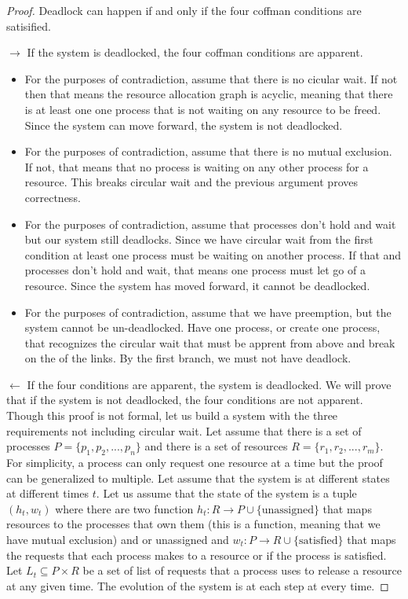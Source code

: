 \begin{proof} Deadlock can happen if and only if the four coffman conditions are satisified.

$\rightarrow$ If the system is deadlocked, the four coffman conditions are apparent.

\begin{itemize}
\item For the purposes of contradiction, assume that there is no cicular wait. If not then that means the resource allocation graph is acyclic, meaning that there is at least one one process that is not waiting on any resource to be freed. Since the system can move forward, the system is not deadlocked.
\item For the purposes of contradiction, assume that there is no mutual exclusion. If not, that means that no process is waiting on any other process for a resource. This breaks circular wait and the previous argument proves correctness.
\item For the purposes of contradiction, assume that processes don't hold and wait but our system still deadlocks. Since we have circular wait from the first condition at least one process must be waiting on another process. If that and processes don't hold and wait, that means one process must let go of a resource. Since the system has moved forward, it cannot be deadlocked.
\item For the purposes of contradiction, assume that we have preemption, but the system cannot be un-deadlocked. Have one process, or create one process, that recognizes the circular wait that must be apprent from above and break on the of the links. By the first branch, we must not have deadlock.
\end{itemize}

$\leftarrow$ If the four conditions are apparent, the system is deadlocked. We will prove that if the system is not deadlocked, the four conditions are not apparent. Though this proof is not formal, let us build a system with the three requirements not including circular wait. Let assume that there is a set of processes $P = \{p_1, p_2, ..., p_n\}$ and there is a set of resources $R = \{r_1, r_2, ..., r_m\}$. For simplicity, a process can only request one resource at a time but the proof can be generalized to multiple. Let assume that the system is at different states at different times $t$. Let us assume that the state of the system is a tuple $(h_t, w_t)$ where there are two function $h_t: R \rightarrow P \cup \{\text{unassigned}\}$ that maps resources to the processes that own them (this is a function, meaning that we have mutual exclusion) and or unassigned and $w_t: P \rightarrow R \cup \{\text{satisfied}\}$ that maps the requests that each process makes to a resource or if the process is satisfied. Let $L_t \subseteq P \times R$ be a set of list of requests that a process uses to release a resource at any given time. The evolution of the system is at each step at every time.


\end{proof}
